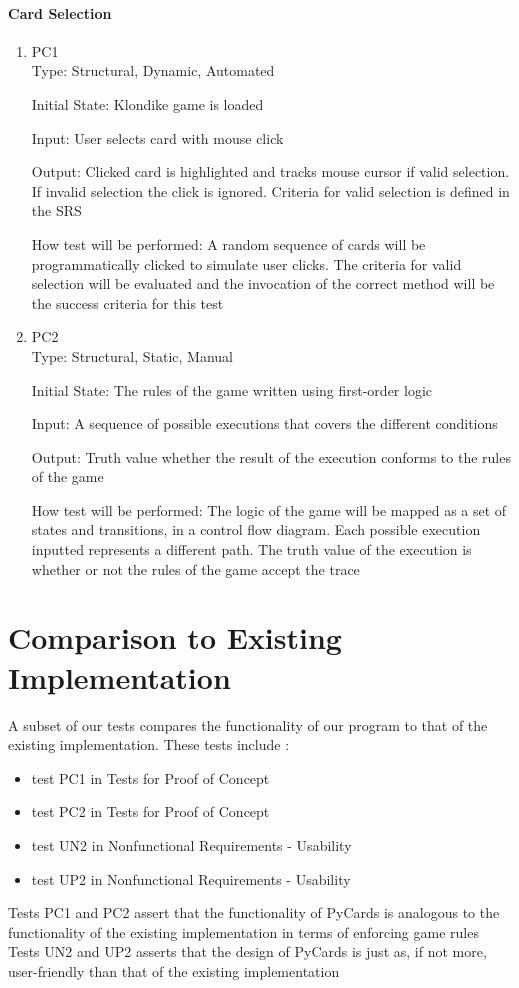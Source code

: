 \documentclass[12pt, titlepage]{article}
\begin{document}
	\paragraph{Card Selection}
	\begin{enumerate}
		\item{PC1\\}
		Type: Structural, Dynamic, Automated
		
		Initial State: Klondike game is loaded
		
		Input: User selects card with mouse click
		
		Output: Clicked card is highlighted and tracks mouse cursor if valid 
		selection. If invalid selection the click is ignored. Criteria for valid 
		selection is defined in the SRS 
		
		How test will be performed: A random sequence of cards will be
		programmatically clicked to simulate user clicks. The criteria for valid 
		selection will be evaluated and the invocation of the correct method will be
		the success criteria for this test

		\item{PC2\\}
		Type: Structural, Static, Manual
		
		Initial State: The rules of the game written using first-order logic
		
		Input: A sequence of possible executions that covers the different conditions
		
		Output: Truth value whether the result of the execution conforms to the rules
		of the game
		
		How test will be performed: The logic of the game will be mapped as a set of
		states and transitions, in a control flow diagram. Each possible execution
		inputted represents a different path. The truth value of the execution is
		whether or not the rules of the game accept the trace
	\end{enumerate} 

	\section{Comparison to Existing Implementation}
		A subset of our tests compares the functionality of our program to that of the
		existing implementation. These tests include : 
	\begin{itemize}
		\itemsep0em
		\item test PC1 in Tests for Proof of Concept
		\item test PC2 in Tests for Proof of Concept
		\item test UN2 in Nonfunctional Requirements - Usability
		\item test UP2 in Nonfunctional Requirements - Usability
	\end{itemize}
	Tests PC1 and PC2 assert that the functionality of PyCards is analogous to the
	functionality of the existing implementation in terms of enforcing game rules
	\newline Tests UN2 and UP2 asserts that the design of PyCards is just as, if
	not more, user-friendly than that of the existing implementation
		
\end{document}
